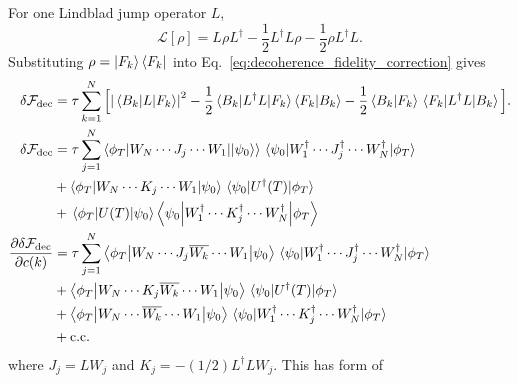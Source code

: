 \documentclass{simple-notes}
\newcommand{\dvbar}[1]{\overline{#1}}
\begin{document}
For one Lindblad jump operator $L$,
\begin{equation}
    \mathcal{L}[\rho]
    =
    L\rho L^\dagger
    -
    \frac{1}{2}L^\dagger L\rho
    -
    \frac{1}{2}\rho L^\dagger L .
\end{equation}
Substituting $\rho=\ket{F_k}\bra{F_k}$ into
Eq.~\eqref{eq:decoherence_fidelity_correction} gives
\begin{align}
    \delta \mathcal{F}_{\mathrm{dec}}
    &=
    \tau
    \sum_{k=1}^{N}
    \Big[
    \abs{\mel{B_k}{L}{F_k}}^2
        -
        \frac{1}{2}
        \mel{B_k}{L^\dagger L}{F_k}
        \braket{F_k}{B_k}
        -
        \frac{1}{2}
        \braket{B_k}{F_k}
        \mel{F_k}{L^\dagger L}{B_k}
    \Big].
    \label{eq:single_lindblad_decoherence_fidelity}\\
    \delta \mathcal{F}_{\mathrm{dec}} &= \tau \sum_{j=1}^{N} \mel**{\phi_T}{W_N\cdots J_j \cdots W_1}{\ket{\psi_0}}\mel{\psi_0}{W_1^\dagger \cdots J_j^\dagger \cdots W_N^\dagger}{\phi_T} \\
    &+\mel**{\phi_T}{W_N\cdots K_j\cdots W_1}{\psi_0}\mel{\psi_0}{U^\dagger(T)}{\phi_T}\notag\\
     &+\mel{\phi_T}{U(T)}{\psi_0}\mel**{\psi_0}{W_1^\dagger \cdots K_j^\dagger \cdots W_N^\dagger}{\phi_T}\notag\\
     \pdv{\delta \mathcal{F}_{\mathrm{dec}}}{c(k)} &= \tau \sum_{j=1}^{N}\mel**{\phi_T}{W_N\cdots J_j \dvbar{W_k} \cdots W_1}{\psi_0}\mel{\psi_0}{W_1^\dagger \cdots J_j^\dagger \cdots W_N^\dagger}{\phi_T} \\ 
     &+ \mel**{\phi_T}{W_N\cdots K_j \dvbar{W_k} \cdots W_1}{\psi_0}\mel{\psi_0}{U^\dagger(T)}{\phi_T}\notag\\
     &+\mel**{\phi_T}{W_N\cdots \dvbar{W_k} \cdots W_1}{\psi_0}\mel{\psi_0}{W_1^\dagger \cdots K_j^\dagger \cdots W_N^\dagger}{\phi_T} \notag\\
     &+\text{c.c.}
\end{align}
where $J_j = L W_j$ and $K_j = -(1/2)L^\dagger L W_j$. This has form of
\end{document}
